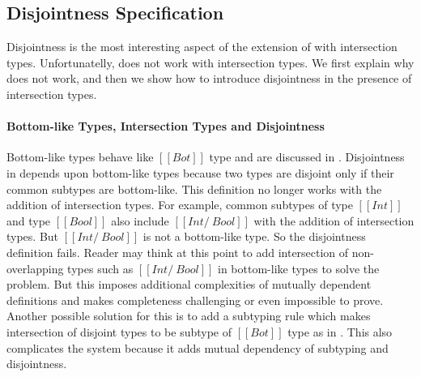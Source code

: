 \subsection{Disjointness Specification}
\label{sec:inter:disj}
Disjointness is the most interesting aspect of the extension of \cal with
intersection types. Unfortunatelly,  does not work with intersection
types. We first explain why  does not work, and then
we show how to introduce disjointness in the presence of intersection types. 


\paragraph{Bottom-like Types, Intersection Types and Disjointness}

\noindent Bottom-like types behave like $[[Bot]]$ type and are discussed in .
Disjointness in  depends upon bottom-like types because two types are disjoint
only if their common subtypes are bottom-like. This definition no longer works with the
addition of intersection types. For example, common subtypes of type $[[Int]]$ and
type $[[Bool]]$ also include $[[Int /\ Bool]]$ with the addition of intersection types.
But $[[Int /\ Bool]]$ is not a bottom-like type. So the disjointness definition fails.
Reader may think at this point to add intersection of non-overlapping types such as $[[Int /\ Bool]]$
in bottom-like types to solve the problem. But this imposes additional complexities of mutually
dependent definitions and makes completeness challenging or even impossible to prove.
Another possible solution for this is to add a subtyping rule which makes intersection of
disjoint types to be subtype of $[[Bot]]$ type as in \cite{}. 
This also complicates the system because
it adds mutual dependency of subtyping and disjointness.


